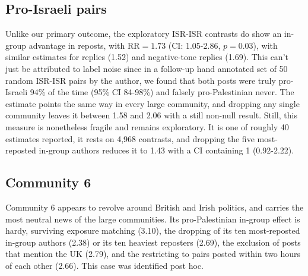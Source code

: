 \documentclass[11pt]{article}   %
\begin{document}
\subsection*{Pro-Israeli pairs}
Unlike our primary outcome, the exploratory ISR-ISR contrasts do show an in-group advantage in reposts, with $\text{RR}=1.73$ (CI: 1.05-2.86, $p = 0.03$), with similar
estimates for replies (1.52) and negative-tone replies (1.69). This can't just be attributed to label noise since in a follow-up hand annotated set of 50 random ISR-ISR pairs by the author, 
we found that both posts were truly pro-Israeli 94\% of the time (95\% CI 84-98\%) and falsely pro-Palestinian never. The estimate points the same way in every large community, and dropping
any single community leaves it between 1.58 and 2.06 with a still non-null result. Still, this measure is nonetheless fragile and remains exploratory. It is one of roughly
40 estimates reported, it rests on 4,968 contrasts, and dropping the five most-reposted in-group
authors reduces it to 1.43 with a CI containing 1 (0.92-2.22).

\subsection*{Community 6}
Community 6 appears to revolve around British and Irish politics, and carries the most neutral news of the large communities. Its pro-Palestinian in-group effect
is hardy, surviving exposure matching (3.10), the dropping of its ten most-reposted in-group authors (2.38)
or its ten heaviest reposters (2.69), the exclusion of posts that mention the UK (2.79), and the restricting to
pairs posted within two hours of each other (2.66). This case was identified post hoc.
\end{document}
